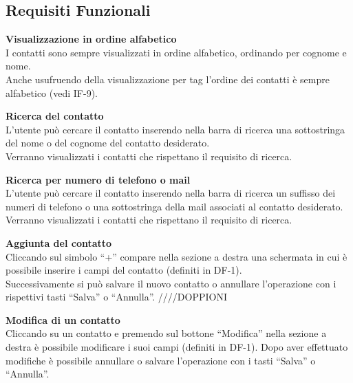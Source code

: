 \subsection{Requisiti Funzionali}
\newcommand{\IFitem}{\addtocounter{IFcounter}{1}IF-\theIFcounter}
	\begin{tcolorbox}[colback=white,colframe=black!80!white,title=\textbf{Funzionalità individuali IF}]
	\begin{itemize}[itemsep=2pt, topsep=0pt, label=\textbf{\IFitem}]
		\item \textbf{Visualizzazione in ordine alfabetico}
		\\I contatti sono sempre visualizzati in ordine alfabetico, ordinando per cognome e nome.
		\\Anche usufruendo della visualizzazione per tag l’ordine dei contatti è sempre alfabetico (vedi IF-9).
		
		\item \textbf{Ricerca del contatto}
		\\L’utente può cercare il contatto inserendo nella barra di ricerca una sottostringa del nome o del cognome del contatto desiderato.
		\\Verranno visualizzati i contatti che rispettano il requisito di ricerca.
		
		\item \textbf{Ricerca per numero di telefono o mail}
		\\L’utente può cercare il contatto inserendo nella barra di ricerca un suffisso dei numeri di telefono o una sottostringa della mail associati al contatto desiderato. 
		\\Verranno visualizzati i contatti che rispettano il requisito di ricerca. 
		
		\item \textbf{Aggiunta del contatto}
		\\Cliccando sul simbolo “+” compare nella sezione a destra una
		schermata in cui è possibile inserire i campi del contatto (definiti in 
		DF-1).
		\\Successivamente si può salvare il nuovo contatto o annullare  
		l’operazione con i rispettivi tasti “Salva” o “Annulla”.
		////DOPPIONI
		
		\item \textbf{Modifica di un contatto}
		\\Cliccando su un contatto e premendo sul bottone “Modifica” nella sezione a destra è possibile modificare i suoi campi (definiti in DF-1). Dopo aver effettuato modifiche è possibile annullare o salvare l’operazione con i tasti “Salva” o “Annulla”.
		

\end{itemize}
\end{tcolorbox}
